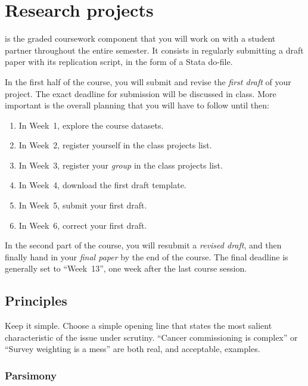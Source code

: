 %
%
%
\chapter{Research projects}%
  \label{ch:paper}%

 is the graded coursework component that you will work on with a student partner throughout the entire semester. It consists in regularly submitting a draft paper with its replication script, in the form of a Stata do-file.

In the first half of the course, you will submit and revise the \emph{first draft} of your project. The exact deadline for submission will be discussed in class. More important is the overall planning that you will have to follow until then:

\begin{enumerate}
  \item In Week~1, explore the course datasets.
  \item In Week~2, register yourself in the class projects list.
  \item In Week~3, register your \emph{group} in the class projects list.
  \item In Week~4, download the first draft template.
  \item In Week~5, submit your first draft.
  \item In Week~6, correct your first draft.
\end{enumerate}

In the second part of the course, you will resubmit a \emph{revised draft}, and then finally hand in your \emph{final paper} by the end of the course. The final deadline is generally set to ``Week~13'', one week after the last course session.

\section{Principles}

Keep it simple. Choose a simple opening line that states the most salient characteristic of the issue under scrutiny. ``Cancer commissioning is complex'' or ``Survey weighting is a mess'' are both real, and acceptable, examples.

\subsection{Parsimony}

